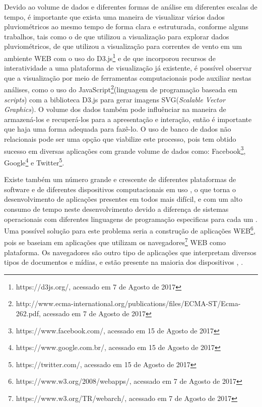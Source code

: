 \documentclass[article,11pt,oneside,a4paper]{abntex2} %
\begin{document}
	Devido ao volume de dados e diferentes formas de análise em diferentes escalas de tempo, é importante que exista uma maneira de visualizar vários dados pluviométricos ao mesmo tempo de forma clara e estruturada, conforme alguns trabalhos, tais como o de  que utilizou a visualização para explorar dados pluviométricos, de   que utilizou a visualização para correntes de vento em um ambiente WEB com o uso do D3.js\footnote{https://d3js.org/, acessado em 7 de Agosto de 2017} e de  que incorporou recursos de interatividade a uma plataforma de visualização já existente, é possível observar que a visualização por meio de ferramentas computacionais pode auxiliar nestas análises, como o uso do  JavaScript\footnote{http://www.ecma-international.org/publications/files/ECMA-ST/Ecma-262.pdf, acessado em 7 de Agosto de 2017}(linguagem de programação baseada em \textit{scripts}) com a biblioteca D3.js para gerar imagens SVG(\textit{Scalable Vector Graphics}). O volume dos dados também pode influênciar na maneira de armazená-los e recuperá-los para a apresentação e interação, então é importante que haja uma forma adequada para fazê-lo. O uso de banco de dados não relacionais pode ser uma opção que viabilize este processo, pois tem obtido sucesso em diversas aplicações com grande volume de dados como: Facebook\footnote{https://www.facebook.com/, acessado em 15 de Agosto de 2017}, Google\footnote{https://www.google.com.br/, acessado em 15 de Agosto de 2017} e Twitter\footnote{https://twitter.com/, acessado em 15 de Agosto de 2017}.
	
	Existe também um número grande e crescente de diferentes plataformas de software e de diferentes dispositivos computacionais em uso \cite{cisco}, o que torna o desenvolvimento de aplicações presentes em todos mais difícil, e com um alto consumo de tempo neste desenvolvimento devido a diferença de sistemas operacionais com diferentes linguagens de programação especificas para cada um \cite{chmielewski2014device}. Uma possível solução para este problema seria a construção de aplicações WEB\footnote{https://www.w3.org/2008/webapps/, acessado em 7 de Agosto de 2017}, pois se baseiam em aplicações que utilizam os navegadores\footnote{https://www.w3.org/TR/webarch/, acessado em 7 de Agosto de 2017} WEB como plataforma. Os navegadores são outro tipo de aplicações que interpretam diversos tipos de documentos e mídias, e estão presente na maioria dos dispositivos  \cite{coulouris2013sistemas}, \cite{berners1991original}.
	
\end{document}
